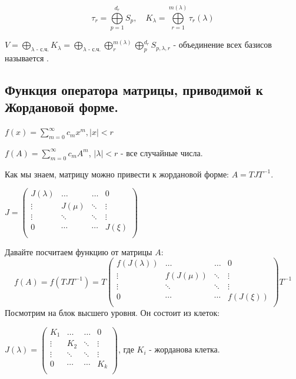$$\tau_r = \bigoplus\limits_{p = 1}^{d_r}S_p, \quad K_{\lambda} = \bigoplus\limits_{r = 1}^{m(\lambda)}\tau_r(\lambda)$$

$V = \bigoplus\limits_{\lambda\text{ - с.ч.}} K_\lambda = \bigoplus\limits_{\lambda\text{ - с.ч.}}\bigoplus\limits_{r}^{m(\lambda)}\bigoplus\limits_{p}^{d_r}S_{p,\lambda,r}$ - объединение всех базисов называется .

\subsection{Функция оператора матрицы, приводимой к Жордановой форме.}

$f(x) = \sum\limits_{m = 0}^{\infty}c_m x^m, |x|< r$ 

$f(A) = \sum\limits_{m=0}^{\infty}c_m A^m$, $|\lambda|< r$ - все случайные числа.

Как мы знаем, матрицу можно привести к жордановой форме: $A = TJT^{-1}$.

$J = \begin{pmatrix}
    J(\lambda) & \ldots & \ldots & 0 \\
    \vdots & J(\mu) & \ddots & \vdots\\
    \vdots & \ddots & \ddots & \vdots\\
    0 & \cdots & \cdots & J(\xi)\\
\end{pmatrix}$

Давайте посчитаем функцию от матрицы $A$:
$$f(A) = f(TJT^{-1}) = T \begin{pmatrix}
    f(J(\lambda)) & \ldots & \ldots & 0 \\
    \vdots & f(J(\mu)) & \ddots & \vdots\\
    \vdots & \ddots & \ddots & \vdots\\
    0 & \cdots & \cdots & f(J(\xi))\\
\end{pmatrix} T^{-1}$$
Посмотрим на блок высшего уровня. Он состоит из клеток:

$J(\lambda ) = \begin{pmatrix}
    K_1 & \ldots & \ldots & 0 \\
    \vdots & K_2 & \ddots & \vdots\\
    \vdots & \ddots & \ddots & \vdots\\
    0 & \cdots & \cdots & K_k\\
\end{pmatrix}$, где $K_i$ - жорданова клетка.

